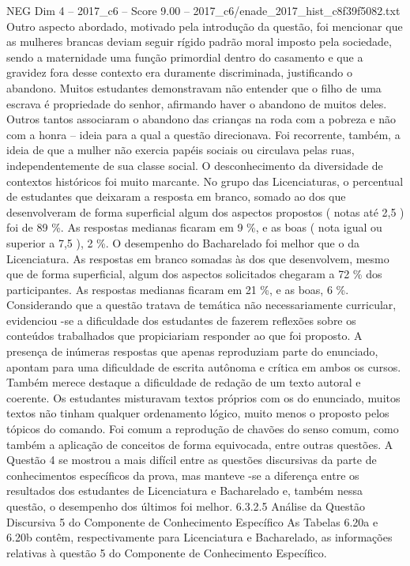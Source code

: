 \begin{textsample}{NEG Dim 4 – 2017\_c6 – Score 9.00 – 2017\_c6/enade\_2017\_hist\_c8f39f5082.txt}
Outro aspecto abordado, motivado pela introdução da questão, foi mencionar que as mulheres brancas deviam seguir rígido padrão moral imposto pela sociedade, sendo a maternidade uma função primordial dentro do casamento e que a gravidez fora desse contexto era duramente discriminada, justificando o abandono.
Muitos estudantes demonstravam não entender que o filho de uma escrava é propriedade do senhor, afirmando haver o abandono de muitos deles.
Outros tantos associaram o abandono das crianças na roda com a pobreza e não com a honra – ideia para a qual a questão direcionava.
Foi recorrente, também, a ideia de que a mulher não exercia papéis sociais ou circulava pelas ruas, independentemente de sua classe social.
O desconhecimento da diversidade de contextos históricos foi muito marcante.
No grupo das Licenciaturas, o percentual de estudantes que deixaram a resposta em branco, somado ao dos que desenvolveram de forma superficial algum dos aspectos propostos ( notas até 2,5 ) foi de 89 \%.
As respostas medianas ficaram em 9 \%, e as boas ( nota igual ou superior a 7,5 ), 2 \%.
O desempenho do Bacharelado foi melhor que o da Licenciatura.
As respostas em branco somadas às dos que desenvolvem, mesmo que de forma superficial, algum dos aspectos solicitados chegaram a 72 \% dos participantes.
As respostas medianas ficaram em 21 \%, e as boas, 6 \%.
Considerando que a questão tratava de temática não necessariamente curricular, evidenciou -se a dificuldade dos estudantes de fazerem reflexões sobre os conteúdos trabalhados que propiciariam responder ao que foi proposto.
A presença de inúmeras respostas que apenas reproduziam parte do enunciado, apontam para uma dificuldade de escrita autônoma e crítica em ambos os cursos.
Também merece destaque a dificuldade de redação de um texto autoral e coerente.
Os estudantes misturavam textos próprios com os do enunciado, muitos textos não tinham qualquer ordenamento lógico, muito menos o proposto pelos tópicos do comando.
Foi comum a reprodução de chavões do senso comum, como também a aplicação de conceitos de forma equivocada, entre outras questões.
A Questão 4 se mostrou a mais difícil entre as questões discursivas da parte de conhecimentos específicos da prova, mas manteve -se a diferença entre os resultados dos estudantes de Licenciatura e Bacharelado e, também nessa questão, o desempenho dos últimos foi melhor. 6.3.2.5 Análise da Questão Discursiva 5 do Componente de Conhecimento Específico As Tabelas 6.20a e 6.20b contêm, respectivamente para Licenciatura e Bacharelado, as informações relativas à questão 5 do Componente de Conhecimento Específico.

\end{textsample}
